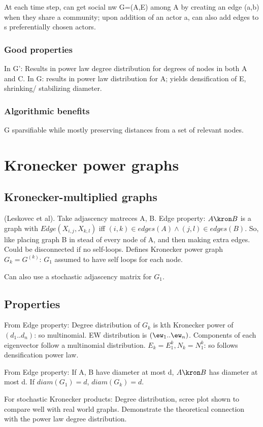 \documentclass[oneside, article]{memoir}
\begin{document}
At each time step, can get social nw G=(A,E) among A by creating an edge (a,b) when they share a community; upon addition of an actor a, can also add edges to s preferentially chosen actors.

\subsubsection{Good properties}
In G': Results in power law degree distribution for degrees of nodes in both A and C. In G: results in power law distribution for A; yields densification of E, shrinking/ stabilizing diameter.

\subsubsection{Algorithmic benefits}
G sparsifiable while mostly preserving distances from a set of relevant nodes.

\section{Kronecker power graphs}
\subsection{Kronecker-multiplied graphs}
(Leskovec et al). Take adjascency matreces A, B. Edge property: $A \kron B$ is a graph with $Edge(X_{i,j}, X_{k,l})$ iff $(i,k)\in edges(A) \land (j,l)\in edges(B)$. So, like placing graph B in stead of every node of A, and then making extra edges. Could be disconnected if no self-loops. Defines Kronecker power graph $G_{k} = G^{(k)}$: $G_{1}$ assumed to have self loops for each node.

Can also use a stochastic adjascency matrix for $G_{1}$.

\subsection{Properties}
From Edge property: Degree distribution of $G_{k}$ is kth Kronecker power of $(d_{1} .. d_{n})$: so multinomial. EW distribution is $(\ew_{1} .. \ew_{n})$. Components of each eigenvector follow a multinomial distribution. \why $E_{k} = E_{1}^{k}, N_{k} = N_{1}^{k}$: so follows densification power law.

From Edge property: If A, B have diameter at most d, $A \kron B$ has diameter at most d. If $diam(G_{1}) = d$, $diam(G_{k}) = d$.

For stochastic Kronecker products: Degree distribution, scree plot shown to compare well with real world graphs. \oprob Demonstrate the theoretical connection with the power law degree distribution.
\end{document}
